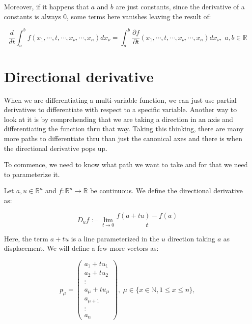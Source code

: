 \documentclass[12pt]{article}
\begin{document}
	Moreover, if it happens that $a$ and $b$ are just constants, since the derivative of a constants is always 0, some terms here vanishes leaving the result of:
	
	\[
		\frac{d}{dt} \int_{a}^{b} f(x_1, \cdots, t, \cdots, x_\nu, \cdots, x_n) dx_\nu
		= \int_{a}^{b} \frac{\partial f}{\partial t}(x_1, \cdots, t, \cdots, x_\nu, \cdots, x_n) dx_\nu,
		\; a, b \in \mathbb{R}
	\]
	
	
	\section{Directional derivative}
	
	When we are differentiating a multi-variable function, we can just use partial derivatives to differentiate with respect to a specific variable. Another way to look at it is by comprehending that we are taking a direction in an axis and differentiating the function thru that way. Taking this thinking, there are many more paths to differentiate thru than just the canonical axes and there is when the directional derivative pops up.
	
	To commence, we need to know what path we want to take and for that we need to parameterize it. 
	
	Let $a, u \in \mathbb{R}^n$ and $f : \mathbb{R}^n \to \mathbb{R}$ be continuous. We define the directional derivative as:
	
	\[
		D_u f := \lim_{t \to 0} \frac{f(a + tu) - f(a)}{t}
	\]
	
	Here, the term $a + tu$ is a line parameterized in the $u$ direction taking $a$ as displacement. We will define a few more vectors as:
	
	\[
		p_\mu =
		\begin{pmatrix}
			a_1 + t u_1
			\\
			a_2 + t u_2
			\\
			\vdots
			\\
			a_\mu + t u_\mu
			\\
			a_{\mu + 1}
			\\
			\vdots
			\\
			a_n
		\end{pmatrix},
		\; \mu \in \{ x \in \mathbb{N}, 1 \le x \le n \},
	\]
	
\end{document}
